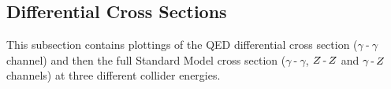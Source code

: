 \documentclass[]{article}
\begin{document}
\subsection{Differential Cross Sections}

This subsection contains plottings of the QED differential cross section ($\gamma\operatorname{-}\gamma$ channel) and then the full Standard Model cross section ($\gamma\operatorname{-}\gamma$, $Z \operatorname{-}Z $ and $\gamma\operatorname{-}Z $ channels) at three different collider energies.

\begin{figure}[H]
	\vspace{10pt}
	\centering
	\subfloat[SM]{
		\label{fig:diffsmbelow}
}
\end{figure}
\end{document}
